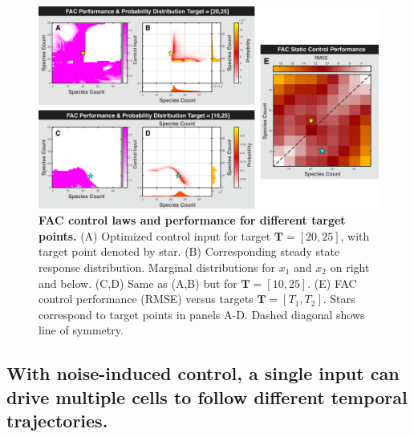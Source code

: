 \documentclass[12pt]{iopart}
\begin{document}
\begin{figure}
\begin{center}
\includegraphics[width=1\textwidth]{StaticControl.pdf}
\vspace{-0.1in}
\caption{{\bf FAC control laws and performance for different target points.} 
(A) Optimized control input for target $\mathbf{T} = [20,25]$, with target point denoted by star. 
(B) Corresponding steady state response distribution. Marginal distributions for $x_1$ and $x_2$  on right and below.
(C,D) Same as (A,B) but for $\mathbf{T} = [10,25]$.
 (E) FAC control performance (RMSE) versus targets $\mathbf{T} = [T_1,T_2]$.  Stars correspond to target points in panels A-D. Dashed diagonal shows line of symmetry.} 
\label{CtrlP}
\end{center}
\vspace{-0.2in}
\end{figure}

\subsection{With noise-induced control, a single input can drive multiple cells to follow different temporal trajectories.}\label{sec:ResTraj}
\end{document}
